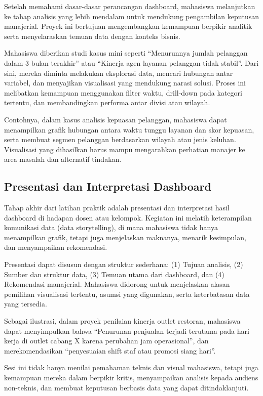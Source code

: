 Setelah memahami dasar-dasar perancangan dashboard, mahasiswa melanjutkan ke tahap analisis yang lebih mendalam untuk mendukung pengambilan keputusan manajerial. Proyek ini bertujuan mengembangkan kemampuan berpikir analitik serta menyelaraskan temuan data dengan konteks bisnis.

Mahasiswa diberikan studi kasus mini seperti “Menurunnya jumlah pelanggan dalam 3 bulan terakhir” atau “Kinerja agen layanan pelanggan tidak stabil”. Dari sini, mereka diminta melakukan eksplorasi data, mencari hubungan antar variabel, dan menyajikan visualisasi yang mendukung narasi solusi. Proses ini melibatkan kemampuan menggunakan filter waktu, drill-down pada kategori tertentu, dan membandingkan performa antar divisi atau wilayah.

Contohnya, dalam kasus analisis kepuasan pelanggan, mahasiswa dapat menampilkan grafik hubungan antara waktu tunggu layanan dan skor kepuasan, serta membuat segmen pelanggan berdasarkan wilayah atau jenis keluhan. Visualisasi yang dihasilkan harus mampu mengarahkan perhatian manajer ke area masalah dan alternatif tindakan.

\subsection{Presentasi dan Interpretasi Dashboard}

Tahap akhir dari latihan praktik adalah presentasi dan interpretasi hasil dashboard di hadapan dosen atau kelompok. Kegiatan ini melatih keterampilan komunikasi data (data storytelling), di mana mahasiswa tidak hanya menampilkan grafik, tetapi juga menjelaskan maknanya, menarik kesimpulan, dan menyampaikan rekomendasi.

Presentasi dapat disusun dengan struktur sederhana: (1) Tujuan analisis, (2) Sumber dan struktur data, (3) Temuan utama dari dashboard, dan (4) Rekomendasi manajerial. Mahasiswa didorong untuk menjelaskan alasan pemilihan visualisasi tertentu, asumsi yang digunakan, serta keterbatasan data yang tersedia.

Sebagai ilustrasi, dalam proyek penilaian kinerja outlet restoran, mahasiswa dapat menyimpulkan bahwa “Penurunan penjualan terjadi terutama pada hari kerja di outlet cabang X karena perubahan jam operasional”, dan merekomendasikan “penyesuaian shift staf atau promosi siang hari”.

Sesi ini tidak hanya menilai pemahaman teknis dan visual mahasiswa, tetapi juga kemampuan mereka dalam berpikir kritis, menyampaikan analisis kepada audiens non-teknis, dan membuat keputusan berbasis data yang dapat ditindaklanjuti.


